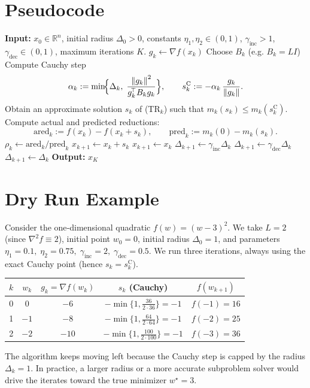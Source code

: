 \documentclass{article}
\newcommand{\R}{\mathbb{R}}
\newcommand{\norm}[1]{\left\lVert #1 \right\rVert}
\begin{document}
\section*{Pseudocode}
\begin{algorithm}[H]
\caption{Trust‑Region Gradient Method (TR‑GM)}\label{alg:trgm}
\begin{algorithmic}[1]
\State \textbf{Input:} $x_0\in\R^{n}$, initial radius $\Delta_0>0$, 
      constants $\eta_1,\eta_2\in(0,1)$, $\gamma_{\text{inc}}>1$, $\gamma_{\text{dec}}\in(0,1)$,
      maximum iterations $K$.
    \State $g_k\gets\nabla f(x_k)$
    \State Choose $B_k$ (e.g. $B_k = L I$)
    \State Compute Cauchy step 
          \[
          \alpha_k:=\min\!\Bigl\{\Delta_k,\;\frac{\norm{g_k}^{2}}{g_k^{\!\top}B_k g_k}\Bigr\},
          \qquad s^{\mathrm{C}}_k:=-\alpha_k\,\frac{g_k}{\norm{g_k}} .
          \]
    \State Obtain an approximate solution $s_k$ of (TR$_k$) such that 
          $m_k(s_k)\le m_k(s^{\mathrm{C}}_k)$.  %
    \State Compute actual and predicted reductions:
          \[
          \text{ared}_k:=f(x_k)-f(x_k+s_k),\qquad
          \text{pred}_k:=m_k(0)-m_k(s_k).
          \]
    \State $\rho_k\gets \text{ared}_k/\text{pred}_k$
        \State $x_{k+1}\gets x_k+s_k$
    \Else
        \State $x_{k+1}\gets x_k$
    \EndIf
        \State $\Delta_{k+1}\gets \gamma_{\text{inc}}\Delta_k$
        \State $\Delta_{k+1}\gets \gamma_{\text{dec}}\Delta_k$
    \Else
        \State $\Delta_{k+1}\gets \Delta_k$
    \EndIf
\EndFor
\State \textbf{Output:} $x_K$
\end{algorithmic}
\end{algorithm}

\section*{Dry Run Example}
Consider the one‑dimensional quadratic $f(w)=(w-3)^2$.  
We take $L=2$ (since $\nabla^2 f\equiv 2$), initial point $w_0=0$, initial radius $\Delta_0=1$, and parameters
$\eta_1=0.1,\;\eta_2=0.75,\;\gamma_{\text{inc}}=2,\;\gamma_{\text{dec}}=0.5$.
We run three iterations, always using the exact Cauchy point (hence $s_k=s^{\mathrm{C}}_k$).

\begin{center}
\begin{tabular}{c|c|c|c|c}
$k$ & $w_k$ & $g_k=\nabla f(w_k)$ & $s_k$ (Cauchy) & $f(w_{k+1})$\\\hline
0 & $0$ & $-6$ & $\displaystyle -\min\{1,\tfrac{36}{2\cdot36}\}= -1$ & $f( -1)=16$\\
1 & $-1$ & $-8$ & $\displaystyle -\min\{1,\tfrac{64}{2\cdot64}\}= -1$ & $f(-2)=25$\\
2 & $-2$ & $-10$ & $\displaystyle -\min\{1,\tfrac{100}{2\cdot100}\}= -1$ & $f(-3)=36$\\
\end{tabular}
\end{center}
The algorithm keeps moving left because the Cauchy step is capped by the radius $\Delta_k=1$.  
In practice, a larger radius or a more accurate subproblem solver would drive the iterates toward the true minimizer $w^\star=3$.
\end{document}
